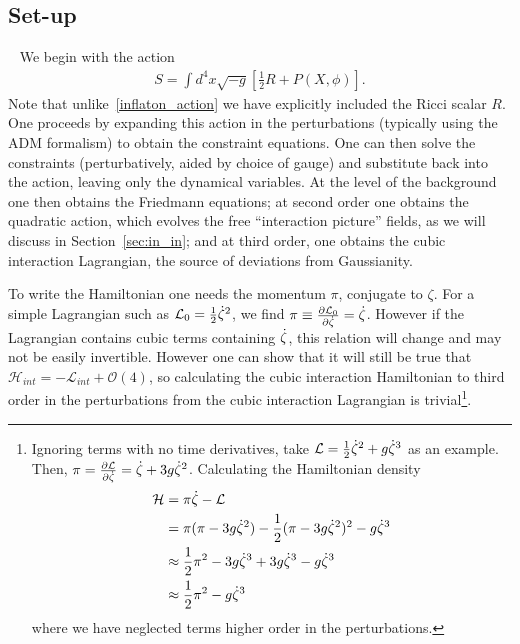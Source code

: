     \subsection{Set-up}\
    We begin with the action
    \begin{align}\label{gr_action}
        S=\int d^4x\sqrt{-g}\left[\frac{1}{2}R+P(X, \phi)\right].
    \end{align}
    Note that unlike~\eqref{inflaton_action} we have explicitly included the
    Ricci scalar $R$.
    One proceeds by expanding this action in the perturbations (typically
    using the ADM formalism)
    to obtain the constraint equations. One can then solve the constraints
    (perturbatively, aided by choice of gauge) and substitute
    back into the action, leaving only the dynamical variables.
    At the level of the background one then obtains the Friedmann equations;
    at second order one obtains the quadratic action, which evolves the
    free ``interaction picture'' fields, as we will discuss in Section~\ref{sec:in_in};
    and at third order, one obtains the cubic
    interaction Lagrangian, the source of deviations from Gaussianity.


    To write the Hamiltonian one needs the momentum $\pi$, conjugate to $\zeta$.
    For a simple Lagrangian such as $\mathcal{L}_{0}=\frac{1}{2}\dot{\zeta}^2$,
    we find $\pi\equiv\frac{\partial \mathcal{L}_0}{\partial \dot{\zeta}}=\dot{\zeta}$. However if the Lagrangian contains cubic terms
    containing $\dot{\zeta}$, this relation will change and may not be easily invertible.
    However one can show that it will still be true that $\mathcal{H}_{int}=-\mathcal{L}_{int}+\mathcal{O}(4)$,
    so calculating the cubic interaction Hamiltonian to third order in the perturbations
    from the cubic interaction Lagrangian is trivial\footnote{
        Ignoring terms with no time derivatives, take $\mathcal{L}=\frac{1}{2}\dot{\zeta}^2+g\dot{\zeta}^3$
        as an example.
        Then, $\pi=\frac{\partial\mathcal{L}}{\partial \dot{\zeta}}=\dot{\zeta}+3g\dot{\zeta}^2$.
        Calculating the Hamiltonian density
        \begin{align}
            \mathcal{H} &= \pi\dot{\zeta} - \mathcal{L}\\
                    &= \pi(\pi-3g\dot{\zeta}^2) - \frac{1}{2}(\pi-3g\dot{\zeta}^2)^2-g\dot{\zeta}^3\\
                    &\approx \frac{1}{2}\pi^2-3g\dot{\zeta}^3 +3g\dot{\zeta}^3-g\dot{\zeta}^3\\
                    &\approx \frac{1}{2}\pi^2-g\dot{\zeta}^3
        \end{align}
        where we have neglected terms higher order in the perturbations.
    }.


